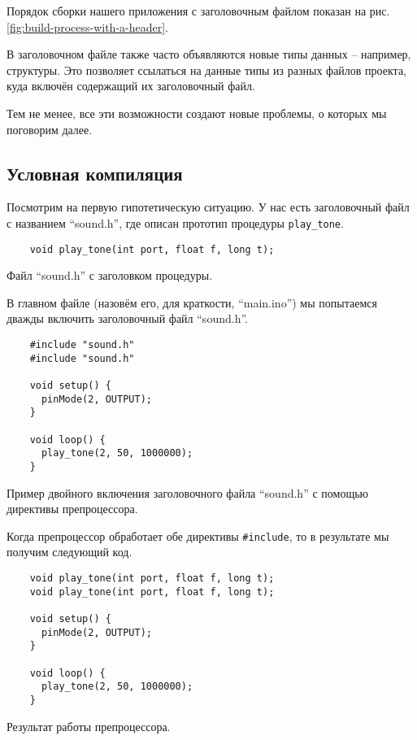 \documentclass[../sparc.tex]{subfiles}
\begin{document}

Порядок сборки нашего приложения с заголовочным файлом показан на
рис. \ref{fig:build-process-with-a-header}.

В заголовочном файле также часто объявляются новые типы данных -- например,
структуры.  Это позволяет ссылаться на данные типы из разных файлов проекта,
куда включён содержащий их заголовочный файл.

Тем не менее, все эти возможности создают новые проблемы, о которых мы поговорим
далее.

\subsection{Условная компиляция}
\label{subsection:conditional-compiling}

Посмотрим на первую гипотетическую ситуацию.  У нас есть заголовочный файл с
названием ``sound.h'', где описан прототип процедуры
\texttt{play_tone}.

\begin{listing}[H]
  \begin{verbatim}
    void play_tone(int port, float f, long t);
  \end{verbatim}
  \label{listing:game-dev-engine-procedure-header-2}
  \caption{Файл ``sound.h'' с заголовком процедуры.}
\end{listing}

В главном файле (назовём его, для краткости, ``main.ino'') мы попытаемся дважды
включить заголовочный файл ``sound.h''.

\begin{listing}[H]
  \begin{verbatim}
    #include "sound.h"
    #include "sound.h"

    void setup() {
      pinMode(2, OUTPUT);
    }

    void loop() {
      play_tone(2, 50, 1000000);
    }
  \end{verbatim}
  \label{listing:game-dev-engine-procedure-header-include-2}
  \caption{Пример двойного включения заголовочного файла ``sound.h'' с помощью
    директивы препроцессора.}
\end{listing}

Когда препроцессор обработает обе директивы \texttt{#include}, то в
результате мы получим следующий код.

\begin{listing}[H]
  \begin{verbatim}
    void play_tone(int port, float f, long t);
    void play_tone(int port, float f, long t);

    void setup() {
      pinMode(2, OUTPUT);
    }

    void loop() {
      play_tone(2, 50, 1000000);
    }
  \end{verbatim}
  \label{listing:game-dev-engine-procedure-header-include-2}
  \caption{Результат работы препроцессора.}
\end{listing}
\end{document}
